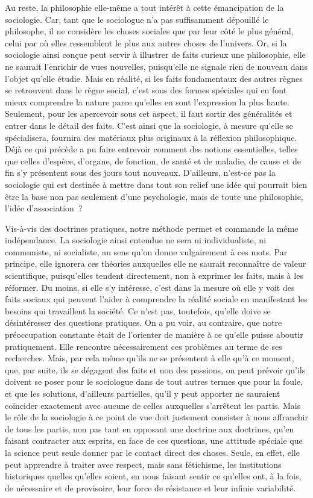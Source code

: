\documentclass[french,twoside]{book} %
\begin{document}
Au reste, la philosophie elle-même a tout intérêt à cette émancipation de la sociologie. Car, tant que le sociologue n’a pas suffisamment dépouillé le philosophe, il ne considère les choses sociales que par leur côté le plus général, celui par où elles ressemblent le plus aux autres choses de l’univers. Or, si la sociologie ainsi conçue peut servir à illustrer de faits curieux une philosophie, elle ne saurait l’enrichir de vues nouvelles, puisqu’elle ne signale rien de nouveau dans l’objet qu’elle étudie. Mais en réalité, si les faits fondamentaux des autres règnes se retrouvent dans le règne social, c’est sous des formes spéciales qui en font mieux comprendre la nature parce qu’elles en sont l’expression la plus haute. Seulement, pour les apercevoir sous cet aspect, il faut sortir des généralités et entrer dans le détail des faits. C’est ainsi que la sociologie, à mesure qu’elle se spécialisera, fournira des matériaux plus originaux à la réflexion philosophique. Déjà ce qui précède a pu faire entrevoir comment des notions essentielles, telles que celles d’espèce, d’organe, de fonction, de santé et de maladie, de cause et de fin s’y présentent sous des jours tout nouveaux. D’ailleurs, n’est-ce pas la sociologie qui est destinée à mettre dans tout son relief une idée qui pourrait bien être la base non pas seulement d’une psychologie, mais de toute une philosophie, l’idée d’association ?\par
Vis-à-vis des doctrines pratiques, notre méthode permet et commande la même indépendance. La sociologie ainsi entendue ne sera ni individualiste, ni communiste, ni socialiste, au sens qu’on donne vulgairement à ces mots. Par principe, elle ignorera ces théories auxquelles elle ne saurait reconnaître de valeur scientifique, puisqu’elles tendent directement, non à exprimer les faits, mais à les réformer. Du moins, si elle s’y intéresse, c’est dans la mesure où elle y voit des faits sociaux qui peuvent l’aider à comprendre la réalité sociale en manifestant les besoins qui travaillent la société. Ce n’est pas, toutefois, qu’elle doive se désintéresser des questions pratiques. On a pu voir, au contraire, que notre préoccupation constante était de l’orienter de manière à ce qu’elle puisse aboutir pratiquement. Elle rencontre nécessairement ces problèmes au terme de ses recherches. Mais, par cela même qu’ils ne se présentent à elle qu’à ce moment, que, par suite, ils se dégagent des faits et non des passions, on peut prévoir qu’ils doivent se poser pour le sociologue dans de tout autres termes que pour la foule, et que les solutions, d’ailleurs partielles, qu’il y peut apporter ne sauraient coïncider exactement avec aucune de celles auxquelles s’arrêtent les partis. Mais le rôle de la sociologie à ce point de vue doit justement consister à nous affranchir de tous les partis, non pas tant en opposant une doctrine aux doctrines, qu’en faisant contracter aux esprits, en face de ces questions, une attitude spéciale que la science peut seule donner par le contact direct des choses. Seule, en effet, elle peut apprendre à traiter avec respect, mais sans fétichisme, les institutions historiques quelles qu’elles soient, en nous faisant sentir ce qu’elles ont, à la fois, de nécessaire et de provisoire, leur force de résistance et leur infinie variabilité.\par
\end{document}
